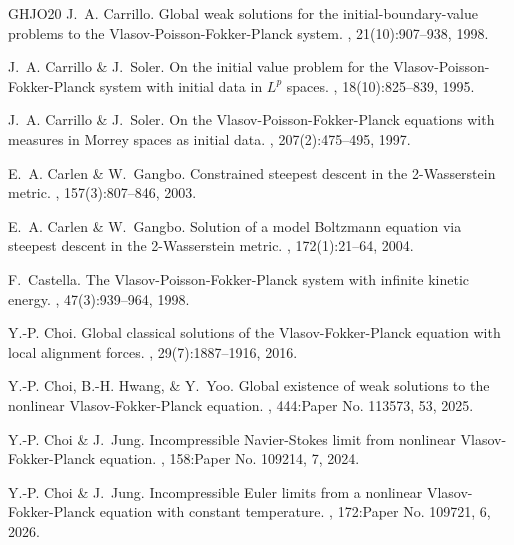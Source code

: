 \documentclass[10pt, reqno]{amsart}
\theoremstyle{plain}
\theoremstyle{definition}
\theoremstyle{remark}
\numberwithin{equation}{section}
\begin{document}
\begin{thebibliography}{GHJO20}
{\sc J.~A. Carrillo.}
\newblock Global weak solutions for the initial-boundary-value problems to the {V}lasov-{P}oisson-{F}okker-{P}lanck system.
, 21(10):907--938, 1998.

{\sc J.~A. Carrillo \& J.~Soler.}
\newblock On the initial value problem for the
  {V}lasov-{P}oisson-{F}okker-{P}lanck system with initial data in {$L^p$}
  spaces.
, 18(10):825--839, 1995.

{\sc J.~A. Carrillo \& J.~Soler.}
\newblock On the {V}lasov-{P}oisson-{F}okker-{P}lanck equations with measures
  in {M}orrey spaces as initial data.
, 207(2):475--495, 1997.


{\sc E.~A. Carlen \& W.~Gangbo.}
\newblock Constrained steepest descent in the 2-{W}asserstein metric.
, 157(3):807--846, 2003.

{\sc E.~A. Carlen \& W.~Gangbo.}
\newblock Solution of a model {B}oltzmann equation via steepest descent in the 2-{W}asserstein metric.
, 172(1):21--64, 2004.

{\sc F.~Castella.}
\newblock The {V}lasov-{P}oisson-{F}okker-{P}lanck system with infinite kinetic
  energy.
, 47(3):939--964, 1998.

{\sc Y.-P. Choi.}
\newblock Global classical solutions of the {V}lasov-{F}okker-{P}lanck equation with local alignment forces.
, 29(7):1887--1916, 2016.

{\sc Y.-P. Choi, B.-H. Hwang, \& Y.~Yoo.}
\newblock Global existence of weak solutions to the nonlinear {V}lasov-{F}okker-{P}lanck equation.
, 444:Paper No. 113573, 53, 2025.

{\sc Y.-P. Choi \& J.~Jung.}
\newblock Incompressible {N}avier-{S}tokes limit from nonlinear {V}lasov-{F}okker-{P}lanck equation.
, 158:Paper No. 109214, 7, 2024.

{\sc Y.-P. Choi \& J.~Jung.}
\newblock Incompressible {E}uler limits from a nonlinear {V}lasov-{F}okker-{P}lanck equation with constant temperature.
, 172:Paper No. 109721, 6, 2026.


\end{thebibliography}
\end{document}
